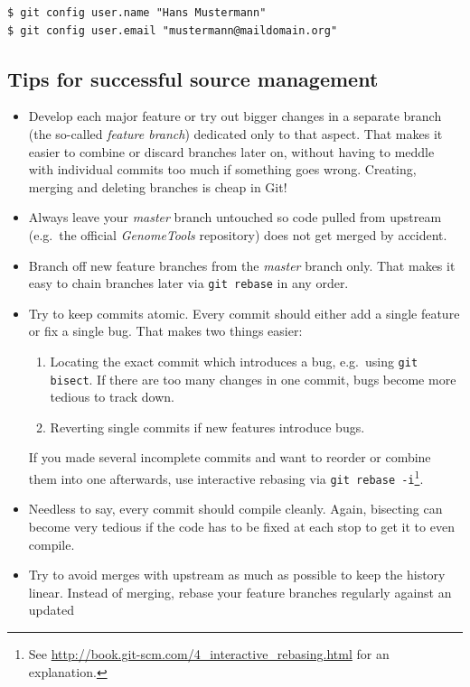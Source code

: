 \documentclass[11pt,final]{article}
\newcommand{\keyword}[1]{\lstinline{#1}}
\newcommand{\Gt}[0]{\emph{GenomeTools}\xspace}
\begin{document}
\begin{lstlisting}
$ git config user.name "Hans Mustermann"
$ git config user.email "mustermann@maildomain.org"
\end{lstlisting}

\subsection{Tips for successful source management}

\begin{itemize}
\item
Develop each major feature or try out bigger changes in a separate branch
(the so-called \emph{feature branch})
dedicated only to that aspect. That makes it easier to combine or discard
branches later on, without having to meddle with individual commits too much
if something goes wrong. Creating, merging and deleting branches is cheap in
Git!
\item
Always leave your \emph{master} branch untouched so code pulled from upstream
(e.g.\ the official \Gt repository) does not get merged by accident.
\item
Branch off new feature branches from the \emph{master} branch only. That makes
it easy to chain branches later via \keyword{git rebase} in any order.
\item
Try to keep commits atomic. Every commit should either add a single feature or
fix a single bug. That makes two things easier:
  \begin{enumerate}
  \item
  Locating the exact commit which introduces a bug, e.g.\ using
  \keyword{git bisect}. If there are too many changes in one commit, bugs
  become more tedious to track down.
  \item
  Reverting single commits if new features introduce bugs.
  \end{enumerate}
If you made several incomplete commits and want to reorder or combine them into one afterwards,
use interactive rebasing via \keyword{git rebase -i}\footnote{See \url{http://book.git-scm.com/4_interactive_rebasing.html} for an explanation.}.
\item
Needless to say, every commit should compile cleanly. Again, bisecting can become
very tedious if the code has to be fixed at each stop to get it to even compile.
\item
Try to avoid merges with upstream as much as possible to keep the history linear.
Instead of merging, rebase your feature branches regularly against an updated

\end{itemize}
\end{document}
